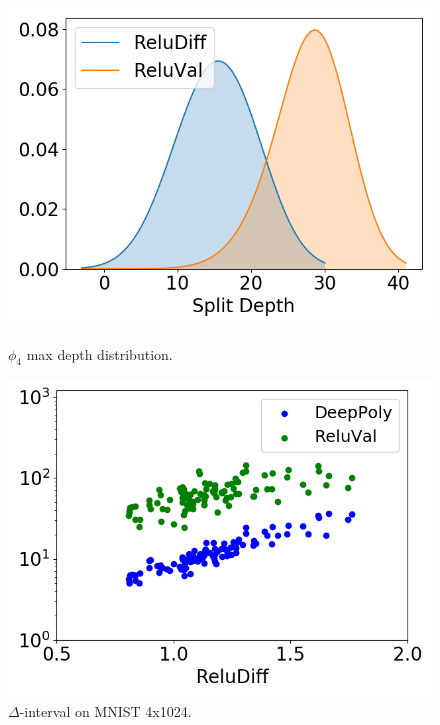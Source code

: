 \begin{figure}[t]
	\begin{minipage}[t]{0.49\linewidth}
		\captionsetup{width=0.8\textwidth}
		\includegraphics[width=\linewidth]{reludiff/figs/prop4_split_depth.png}
		\caption{$ \phi_4 $ max depth distribution.\label{fig:prop4_depth}}
	\end{minipage}
	\begin{minipage}[t]{0.495\linewidth}
				\captionsetup{width=0.9\textwidth}
			\includegraphics[width=\linewidth]{reludiff/figs/deeppoly_mnist_4_1024_compare.png}
			\caption{$\Delta $-interval on MNIST 4x1024\label{fig:deeppoly_comp}.}
	\end{minipage}%
\end{figure}

